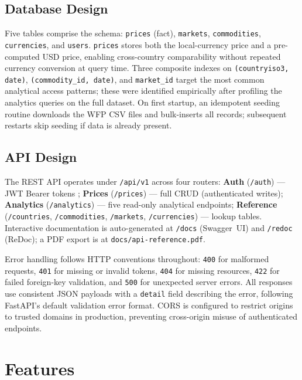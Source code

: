 \subsection{Database Design}

Five tables comprise the schema: \texttt{prices} (fact), \texttt{markets},
\texttt{commodities}, \texttt{currencies}, and \texttt{users}.
\texttt{prices} stores both the local-currency price and a pre-computed USD price,
enabling cross-country comparability without repeated currency conversion at query time.
Three composite indexes on \texttt{(countryiso3, date)},
\texttt{(commodity\_id, date)}, and \texttt{market\_id} target the most
common analytical access patterns; these were identified empirically after profiling
the analytics queries on the full dataset.
On first startup, an idempotent seeding routine downloads the WFP CSV files and
bulk-inserts all records; subsequent restarts skip seeding if data is already present.

\subsection{API Design}

The REST API operates under \texttt{/api/v1} across
four routers:
\textbf{Auth} (\texttt{/auth}) — JWT Bearer tokens \parencite{rfc7519};
\textbf{Prices} (\texttt{/prices}) — full CRUD (authenticated writes);
\textbf{Analytics} (\texttt{/analytics}) — five read-only analytical endpoints;
\textbf{Reference} (\texttt{/countries}, \texttt{/commodities},
\texttt{/markets}, \texttt{/currencies}) — lookup tables.
Interactive documentation is auto-generated at \texttt{/docs} (Swagger~UI) and
\texttt{/redoc} (ReDoc); a PDF export is at \texttt{docs/api-reference.pdf}.

Error handling follows HTTP conventions throughout: \texttt{400} for malformed
requests, \texttt{401} for missing or invalid tokens, \texttt{404} for missing
resources, \texttt{422} for failed foreign-key validation, and \texttt{500} for
unexpected server errors.
All responses use consistent JSON payloads with a \texttt{detail} field describing
the error, following FastAPI's default validation error format.
CORS is configured to restrict origins to trusted domains in production,
preventing cross-origin misuse of authenticated endpoints.

\section{Features}

